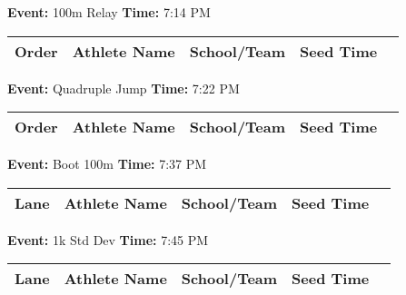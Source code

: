 \documentclass[11pt]{article}
\begin{document}
\textbf{Event:} 100m Relay \quad \textbf{Time:} 7:14 PM 

\vspace{1em}
\begin{tabular}{@{}lllll@{}}
\toprule
\textbf{Order} & \textbf{Athlete Name} & \textbf{School/Team} & \textbf{Seed Time} \\
\midrule

\bottomrule
\end{tabular}
\vspace{2.5em}


\textbf{Event:} Quadruple Jump \quad \textbf{Time:} 7:22 PM 

\vspace{1em}
\begin{tabular}{@{}lllll@{}}
\toprule
\textbf{Order} & \textbf{Athlete Name} & \textbf{School/Team} & \textbf{Seed Time} \\
\midrule

\bottomrule
\end{tabular}
\vspace{2.5em}


\textbf{Event:} Boot 100m \quad \textbf{Time:} 7:37 PM 

\vspace{1em}
\begin{tabular}{@{}lllll@{}}
\toprule
\textbf{Lane} & \textbf{Athlete Name} & \textbf{School/Team} & \textbf{Seed Time} \\
\midrule

\bottomrule
\end{tabular}
\vspace{2.5em}


\textbf{Event:} 1k Std Dev \quad \textbf{Time:} 7:45 PM 

\vspace{1em}
\begin{tabular}{@{}lllll@{}}
\toprule
\textbf{Lane} & \textbf{Athlete Name} & \textbf{School/Team} & \textbf{Seed Time} \\
\midrule

\bottomrule
\end{tabular}
\vspace{2.5em}
\end{document}
